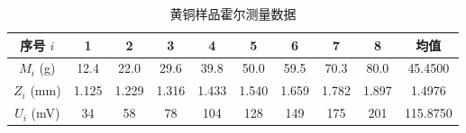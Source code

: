 \documentclass[UTF8]{article}
\theoremstyle{MyLineTheoremStyle} %
\theoremstyle{MyBlockTheoremStyle} %
\theoremstyle{MySubsubsectionStyle} %
\begin{document}
\begin{table}[H]\centering
    \caption{黄铜样品几何尺寸测量数据}
    \label{黄铜样品几何尺寸测量数据}
\end{table}
\begin{table}[H]\centering
    \caption{黄铜样品霍尔测量数据}
    \label{黄铜样品霍尔测量数据}
\begin{tabular}{cccccccccc}\toprule
    序号 $i$ & 1 & 2 & 3 & 4 & 5 & 6 & 7 & 8 & 均值 \\
    \midrule
    $M_i$ (g)& 12.4 & 22.0 & 29.6 & 39.8 & 50.0 & 59.5 & 70.3 & 80.0 &  45.4500 \\
    $Z_i$  (mm) & 1.125 & 1.229 & 1.316 & 1.433 & 1.540 & 1.659 & 1.782 & 1.897 &  1.4976 \\
    $U_i$  (mV) & 34 & 58 & 78 & 104 & 128 & 149 & 175 & 201 &  115.8750 \\ 
    \bottomrule
\end{tabular}
\end{table}
\end{document}
